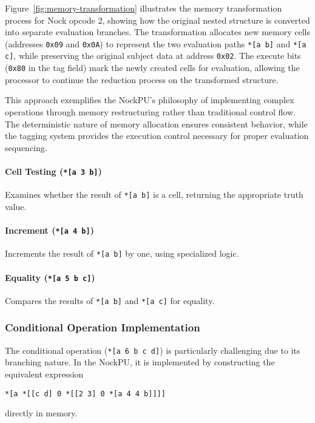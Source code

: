 \documentclass[twoside]{article}
\begin{document}
Figure~\ref{fig:memory-transformation} illustrates the memory transformation process for Nock opcode 2, showing how the original nested structure is converted into separate evaluation branches. The transformation allocates new memory cells (addresses \texttt{0x09} and \texttt{0x0A}) to represent the two evaluation paths \texttt{*[a b]} and \texttt{*[a c]}, while preserving the original subject data at address \texttt{0x02}. The execute bits (\texttt{0x80} in the tag field) mark the newly created cells for evaluation, allowing the processor to continue the reduction process on the transformed structure.



This approach exemplifies the NockPU's philosophy of implementing complex operations through memory restructuring rather than traditional control flow. The deterministic nature of memory allocation ensures consistent behavior, while the tagging system provides the execution control necessary for proper evaluation sequencing.

\paragraph{Cell Testing (\texttt{*[a 3 b]})} Examines whether the result of \texttt{*[a b]} is a cell, returning the appropriate truth value.

\paragraph{Increment (\texttt{*[a 4 b]})} Increments the result of \texttt{*[a b]} by one, using specialized logic.

\paragraph{Equality (\texttt{*[a 5 b c]})} Compares the results of \texttt{*[a b]} and \texttt{*[a c]} for equality.

\subsubsection{Conditional Operation Implementation}

The conditional operation (\texttt{*[a 6 b c d]}) is particularly challenging due to its branching nature. In the NockPU, it is implemented by constructing the equivalent expression 
\begin{lstlisting}[style=listingblock]
*[a *[[c d] 0 *[[2 3] 0 *[a 4 4 b]]]]
\end{lstlisting}
directly in memory.
\end{document}
